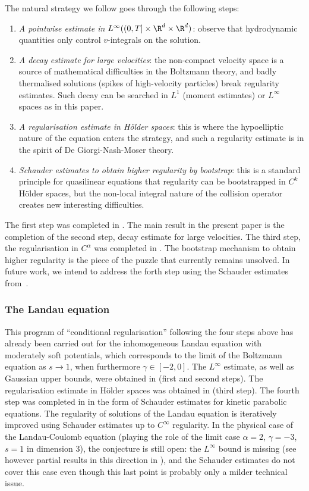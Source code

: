 The natural strategy we follow goes through the following steps:
\begin{enumerate}
\item \emph{A pointwise estimate in
$L^\infty((0,T] \times \R^d \times \R^d)$}: observe that hydrodynamic
quantities only control $v$-integrals on the solution.
\item \emph{A decay estimate for large velocities}: the non-compact
velocity space is a source of mathematical difficulties in the
Boltzmann theory, and badly thermalised solutions (\eg spikes of
high-velocity particles) break regularity estimates. Such decay can
be searched in $L^1$ (moment estimates) or $L^\infty$ spaces as in
this paper.
\item \emph{A regularisation estimate in Hölder spaces}: this is
where the hypoelliptic nature of the equation enters the strategy,
and such a regularity estimate is in the spirit of De
Giorgi-Nash-Moser theory.
\item \emph{Schauder estimates to obtain higher regularity by
bootstrap}: this is a standard principle for quasilinear equations
that regularity can be bootstrapped in $C^{k}$ Hölder spaces, but
the non-local integral nature of the collision operator creates new
interesting difficulties.
\end{enumerate}

The first step was completed in \cite{luis}. The main result in the
present paper is the completion of the second step, \ie decay
estimate for large velocities. The third step, \ie the regularisation
in $C^\alpha$ was completed in \cite{is}. The bootstrap mechanism to
obtain higher regularity is the piece of the puzzle that currently
remains unsolved. In future work, we intend to address the forth step using the Schauder estimates from~\cite{imbert2018schauder}.

\subsubsection{The Landau equation} This program of ``conditional
regularisation'' following the four steps above has already been
carried out for the inhomogeneous Landau equation with moderately soft
potentials, which corresponds to the limit of the Boltzmann equation
as $s \to 1$, when furthermore $\gamma \in [-2,0]$. The $L^\infty$
estimate, as well as Gaussian upper bounds, were obtained in
\cite{css} (first and second steps). The regularisation estimate in
Hölder spaces was obtained in \cite{gimv} (third step). The fourth
step was completed in \cite{henderson2017c} in the form of Schauder
estimates for kinetic parabolic equations. The regularity of solutions
of the Landau equation is iteratively improved using Schauder
estimates up to $C^\infty$ regularity. In the physical case of the
Landau-Coulomb equation (playing the role of the limit case
$\alpha = 2$, $\gamma = -3$, $s=1$ in dimension $3$), the conjecture
is still open: the $L^\infty$ bound is missing (see however partial
results in this direction in \cite{luis-landau}), and the Schauder
estimates \cite{henderson2017c} do not cover this case even though
this last point is probably only a milder technical issue.

